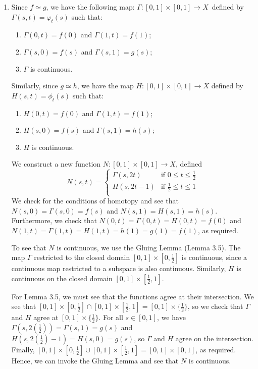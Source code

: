 \documentclass{article}
\begin{document}
\begin{flushleft}
\begin{enumerate}[label=(\roman*)]
        \item Since $f \simeq g$, we have the following map: $\Gamma : [0,1] \times [0,1] \rightarrow X \,$ defined by $\Gamma(s,t) = \varphi_t(s)$ such that:
            \begin{enumerate}[label=\arabic*)]
                \item $\Gamma(0, t) = f(0)$ and $\Gamma(1, t) = f(1)$;
                \item $\Gamma(s, 0) = f(s)$ and $\Gamma(s, 1) = g(s)$;
                \item $\Gamma$ is continuous.
            \end{enumerate}
        Similarly, since $g \simeq h$, we have the map $H : [0,1] \times [0,1] \rightarrow X $ defined by $H(s,t) = \phi_t(s)$ such that: 
            \begin{enumerate}[label=\arabic*)]
                \item $H(0, t) = f(0)$ and $\Gamma(1, t) = f(1)$;
                \item $H(s, 0) = f(s)$ and $\Gamma(s, 1) = h(s)$;
                \item $H$ is continuous.
            \end{enumerate}
        We construct a new function $N : [0,1] \times [0,1] \rightarrow X$, defined
        \[ N(s,t) =
        \begin{cases}
            \Gamma(s, 2t) & \text{if } 0 \leq t \leq \frac{1}{2} \\
            H(s, 2t - 1) & \text{if } \frac{1}{2} \leq t \leq 1 \\ 
        \end{cases} 
        \]
        We check for the conditions of homotopy and see that $N(s, 0) = \Gamma(s, 0) = f(s)$ and $N(s, 1) = H(s, 1) = h(s)$. Furthermore, we check that $N(0, t) = \Gamma(0, t) = H(0, t) = f(0)$ and $N(1, t) = \Gamma(1, t) = H(1, t) = h(1) = g(1) = f(1)$, as required. \newline

        To see that $N$ is continuous, we use the Gluing Lemma (Lemma 3.5). The map $\Gamma$ restricted to the closed domain $[0, 1] \times [0,\frac{1}{2}]$ is continuous, since a continuous map restricted to a subspace is also continuous. Similarly, $H$ is continuous on the closed domain $[0,1] \times [\frac{1}{2}, 1]$. \newline 
        
        For Lemma 3.5, we must see that the functions agree at their intersection. We see that $[0,1] \times [0, \frac{1}{2}] \cap [0,1] \times [\frac{1}{2}, 1] = [0,1] \times \{\frac{1}{2}\}$, so we check that $\Gamma$ and $H$ agree at $[0,1] \times \{\frac{1}{2}\}$. For all $s \in [0,1]$, we have $\Gamma(s, 2(\frac{1}{2})) = \Gamma(s, 1) = g(s)$ and $H(s, 2(\frac{1}{2}) - 1) = H(s, 0) = g(s)$, so $\Gamma$ and $H$ agree on the intersection. Finally, $[0,1] \times [0, \frac{1}{2}] \cup [0,1] \times [\frac{1}{2}, 1] = [0,1] \times [0,1]$, as required. Hence, we can invoke the Gluing Lemma and see that $N$ is continuous. \newline


\end{enumerate}
\end{flushleft}
\end{document}
